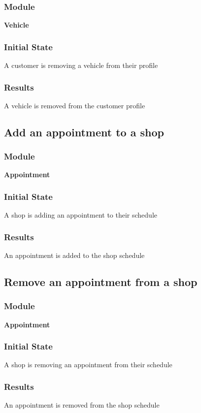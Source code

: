 \documentclass[12pt, titlepage]{article}
\begin{document}
    \subsubsection{Module}
    \textbf{Vehicle}
    \subsubsection{Initial State}
    A customer is removing a vehicle from their profile
    \subsubsection{Results}
    A vehicle is removed from the customer profile

\subsection{Add an appointment to a shop}
    \subsubsection{Module}
    \textbf{Appointment}
    \subsubsection{Initial State}
    A shop is adding an appointment to their schedule
    \subsubsection{Results}
    An appointment is added to the shop schedule

\subsection{Remove an appointment from a shop}
    \subsubsection{Module}
    \textbf{Appointment}
    \subsubsection{Initial State}
    A shop is removing an appointment from their schedule
    \subsubsection{Results}
    An appointment is removed from the shop schedule
\end{document}
